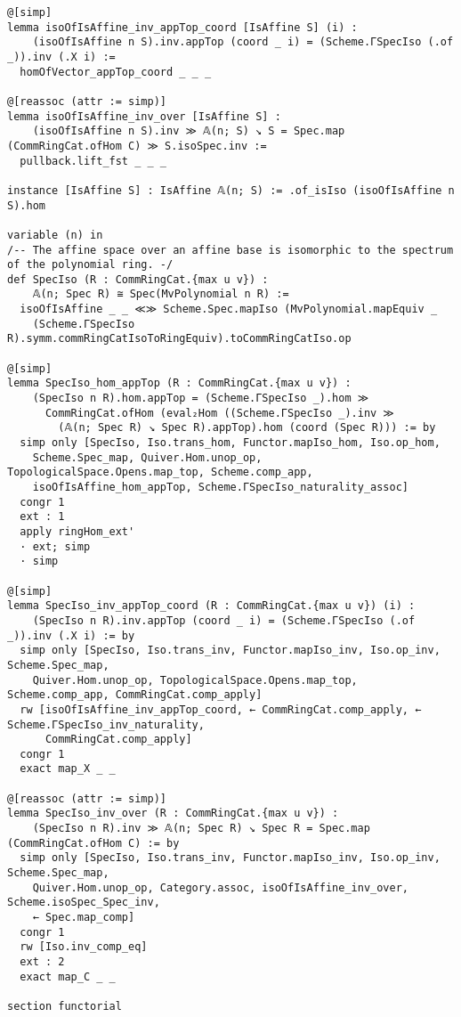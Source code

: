 \documentclass{article}
\begin{document}
\begin{lstlisting}[language=Lean, caption={AffineSpace.lean}]
@[simp]
lemma isoOfIsAffine_inv_appTop_coord [IsAffine S] (i) :
    (isoOfIsAffine n S).inv.appTop (coord _ i) = (Scheme.ΓSpecIso (.of _)).inv (.X i) :=
  homOfVector_appTop_coord _ _ _

@[reassoc (attr := simp)]
lemma isoOfIsAffine_inv_over [IsAffine S] :
    (isoOfIsAffine n S).inv ≫ 𝔸(n; S) ↘ S = Spec.map (CommRingCat.ofHom C) ≫ S.isoSpec.inv :=
  pullback.lift_fst _ _ _

instance [IsAffine S] : IsAffine 𝔸(n; S) := .of_isIso (isoOfIsAffine n S).hom

variable (n) in
/-- The affine space over an affine base is isomorphic to the spectrum of the polynomial ring. -/
def SpecIso (R : CommRingCat.{max u v}) :
    𝔸(n; Spec R) ≅ Spec(MvPolynomial n R) :=
  isoOfIsAffine _ _ ≪≫ Scheme.Spec.mapIso (MvPolynomial.mapEquiv _
    (Scheme.ΓSpecIso R).symm.commRingCatIsoToRingEquiv).toCommRingCatIso.op

@[simp]
lemma SpecIso_hom_appTop (R : CommRingCat.{max u v}) :
    (SpecIso n R).hom.appTop = (Scheme.ΓSpecIso _).hom ≫
      CommRingCat.ofHom (eval₂Hom ((Scheme.ΓSpecIso _).inv ≫
        (𝔸(n; Spec R) ↘ Spec R).appTop).hom (coord (Spec R))) := by
  simp only [SpecIso, Iso.trans_hom, Functor.mapIso_hom, Iso.op_hom,
    Scheme.Spec_map, Quiver.Hom.unop_op, TopologicalSpace.Opens.map_top, Scheme.comp_app,
    isoOfIsAffine_hom_appTop, Scheme.ΓSpecIso_naturality_assoc]
  congr 1
  ext : 1
  apply ringHom_ext'
  · ext; simp
  · simp

@[simp]
lemma SpecIso_inv_appTop_coord (R : CommRingCat.{max u v}) (i) :
    (SpecIso n R).inv.appTop (coord _ i) = (Scheme.ΓSpecIso (.of _)).inv (.X i) := by
  simp only [SpecIso, Iso.trans_inv, Functor.mapIso_inv, Iso.op_inv, Scheme.Spec_map,
    Quiver.Hom.unop_op, TopologicalSpace.Opens.map_top, Scheme.comp_app, CommRingCat.comp_apply]
  rw [isoOfIsAffine_inv_appTop_coord, ← CommRingCat.comp_apply, ← Scheme.ΓSpecIso_inv_naturality,
      CommRingCat.comp_apply]
  congr 1
  exact map_X _ _

@[reassoc (attr := simp)]
lemma SpecIso_inv_over (R : CommRingCat.{max u v}) :
    (SpecIso n R).inv ≫ 𝔸(n; Spec R) ↘ Spec R = Spec.map (CommRingCat.ofHom C) := by
  simp only [SpecIso, Iso.trans_inv, Functor.mapIso_inv, Iso.op_inv, Scheme.Spec_map,
    Quiver.Hom.unop_op, Category.assoc, isoOfIsAffine_inv_over, Scheme.isoSpec_Spec_inv,
    ← Spec.map_comp]
  congr 1
  rw [Iso.inv_comp_eq]
  ext : 2
  exact map_C _ _

section functorial


\end{lstlisting}
\end{document}
